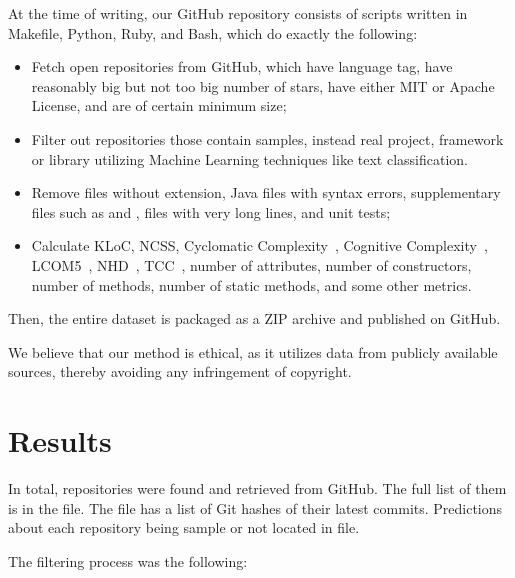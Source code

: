 \documentclass[sigplan,nonacm,review,anonymous]{acmart}
\begin{document}
At the time of writing, our GitHub repository consists of scripts written in Makefile,
Python, Ruby, and Bash, which do exactly the following:
\begin{itemize}
    \item Fetch open repositories from GitHub, which have  language
    tag, have reasonably big but not too big number of stars, have either MIT or Apache License,
    and are of certain minimum size;
    \item Filter out repositories those contain samples, instead real project,
    framework or library utilizing Machine Learning techniques like text
    classification.
    \item Remove files without  extension, Java files with syntax errors,
    supplementary files such as  and ,
    files with very long lines, and unit tests;
    \item Calculate KLoC, NCSS, Cyclomatic Complexity~\citep{mccabe1976complexity},
    Cognitive Complexity~\citep{campbell2018cognitive}, LCOM5~\citep{henderson1996coupling},
    NHD~\citep{counsell2006interpretation}, TCC~\citep{bieman1995cohesion},
    number of attributes, number of constructors, number of methods, number of static methods,
    and some other metrics.
\end{itemize}

Then, the entire dataset is packaged as a ZIP archive and published
on GitHub.

We believe that our method is ethical, as it utilizes data from publicly
available sources, thereby avoiding any infringement of copyright.

\section{Results}\label{sec:results}

In total, \unskip{} repositories
were found and retrieved from GitHub.
The full list of them is in the  file.
The  file has a list of Git hashes of their latest commits.
Predictions about each repository being sample or not located in  file.

The filtering process was the following:

\begin{enumerate}
\unskip{}
\end{enumerate}
\end{document}

